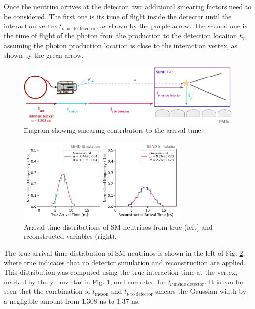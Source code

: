Once the neutrino arrives at the detector, two additional smearing factors need to be considered.
The first one is its time of flight inside the detector until the interaction vertex $t_{\nu\ \mathrm{inside\ detector}}$, as shown by the purple arrow.
The second one is the time of flight of the photon from the production to the detection location $t_{\gamma}$, assuming the photon production location is close to the interaction vertex, as shown by the green arrow.

\begin{figure}[h!]
    \centering
    \includegraphics[width=1.0\textwidth]{smearing_factors.png}
    \caption[Smearing Contributors to the Arrival Time]{Diagram showing smearing contributors to the arrival time.}
    \label{fig:smearing_factors}
\end{figure}

\begin{figure}[hb!]
    \centering
    \includegraphics[width=0.75\textwidth]{truth_reco_gaus.png}
    \caption[Arrival Time of SM Neutrinos from True and Reconstructed Variables]{
    Arrival time distributions of SM neutrinos from true (left) and reconstructed variables (right).
    }
    \label{fig:gaus_truth_reco}
\end{figure}

The true arrival time distribution of SM neutrinos is shown in the left of Fig. \ref{fig:gaus_truth_reco}, where true indicates that no detector simulation and reconstruction are applied.
This distribution was computed using the true interaction time at the vertex, marked by the yellow star in Fig. \ref{fig:smearing_factors}, and corrected for $t_{\nu\ \mathrm{inside\ detector}}$.
It is can be seen that the combination of $t_{\mathrm{meson}}$ and $t_{\nu\ \mathrm{to\ detector}}$ smears the Gaussian width by a negligible amount from 1.308 ns to 1.37 ns.

